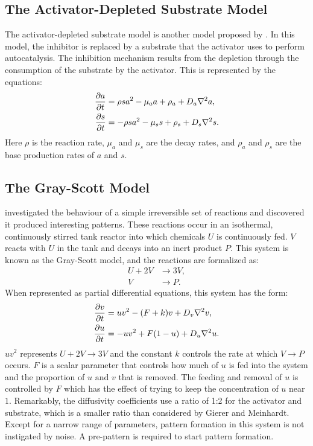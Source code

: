 \subsection{The Activator-Depleted Substrate Model}
The activator-depleted substrate model is another model proposed by \citet{gierer1972}. In this model, the inhibitor is replaced by a substrate that the activator uses to perform autocatalysis. The inhibition mechanism results from the depletion through the consumption of the substrate by the activator. This is represented by the equations:
	\begin{equation}
	\begin{aligned} \label{eq:activatorSubstrateRD}
		\frac{\partial a}{\partial t} &= \rho sa^2 - \mu_a a + \rho_a + D_a \nabla^2 a,\\
		\frac{\partial s}{\partial t} &= -\rho sa^2 - \mu_s s + \rho_s + D_s \nabla^2 s.
	\end{aligned}
	\end{equation}
Here $\rho$ is the reaction rate, $\mu_a$ and $\mu_s$ are the decay rates, and $\rho_a$ and $\rho_s$ are the base production rates of $a$ and $s$.

\subsection{The Gray-Scott Model}
\citet{gray1984} investigated the behaviour of a simple irreversible set of reactions and discovered it produced interesting patterns. These reactions occur in an isothermal, continuously stirred tank reactor into which chemicals $U$ is continuously fed. $V$ reacts with $U$ in the tank and decays into an inert product $P$. This system is known as the Gray-Scott model, and the reactions are formalized as:
	\begin{equation}
	\begin{aligned}
		U + 2V &\to 3V, \\
		V &\to P.
	\end{aligned}
	\end{equation}
When represented as partial differential equations, this system has the form:
	\begin{equation}
	\begin{aligned} \label{eq:grayscottRD}
		\frac{\partial v}{\partial t} &= uv^2 - (F+k)v + D_v \nabla^2 v,\\
		\frac{\partial u}{\partial t} &= -uv^2 + F(1-u) + D_u \nabla^2 u.
	\end{aligned}
	\end{equation}
$uv^2$ represents $U + 2V \to 3V$ and the constant $k$ controls the rate at which $V \to P$ occurs. $F$ is a scalar parameter that controls how much of $u$ is fed into the system and the proportion of $u \text{ and } v$ that is removed. The feeding and removal of $u$ is controlled by $F$ which has the effect of trying to keep the concentration of $u$ near $1$. Remarkably, the diffusivity coefficients use a ratio of 1:2 for the activator and substrate, which is a smaller ratio than considered by Gierer and Meinhardt. Except for a narrow range of parameters, pattern formation in this system is not instigated by noise. A pre-pattern is required to start pattern formation. 

